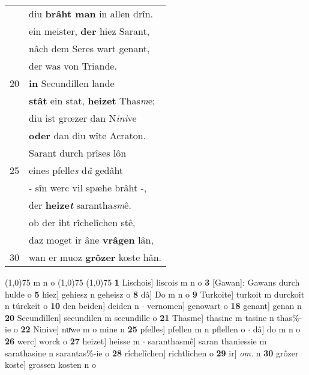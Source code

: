 \documentclass[8pt,a4paper,notitlepage]{article}
\begin{document}
\begin{table}[ht]
\begin{minipage}[t]{0.5\linewidth}
\begin{tabular}{rl}
 & diu \textbf{brâht man} in allen drîn.\\ 
 & ein meister, \textbf{der} hiez Sarant,\\ 
 & nâch dem Seres wart genant,\\ 
 & der was von Triande.\\ 
20 & \textbf{in} Secundillen lande\\ 
 & \textbf{stât} ein stat, \textbf{heizet} Thas\textit{m}e;\\ 
 & diu ist grœzer dan N\textit{ini}ve\\ 
 & \textbf{oder} dan diu wîte Acraton.\\ 
 & Sarant durch prîses lôn\\ 
25 & eines pfelle\textit{s} d\textit{â} gedâht\\ 
 & - sîn werc vil spæhe brâht -,\\ 
 & der \textbf{heize\textit{t}} sarantha\textit{sm}ê.\\ 
 & ob der iht rîchelîchen stê,\\ 
 & daz moget ir âne \textbf{vrâgen} lân,\\ 
30 & wan er muoz \textbf{grôzer} koste hân.\\ 
\end{tabular}
\scriptsize
\line(1,0){75} \newline
m n o \newline
\line(1,0){75} \newline
\newline
\line(1,0){75} \newline
\textbf{1} Lischois] liscois m n o \textbf{3} [Gawan]: Gawans durch hulde o \textbf{5} hiez] gehiesz n geheisz o \textbf{8} dâ] Do m n o \textbf{9} Turkoite] turkoit m durckoit n túrckeit o \textbf{10} den beiden] deiden n  $\cdot$ vernomen] genowart o \textbf{18} genant] genan n \textbf{20} Secundillen] secundilen m secundille o \textbf{21} Thasme] thasine m tasine n thas\%-ie o \textbf{22} Ninive] nuͯwe m o mine n \textbf{25} pfelles] pfellen m n pflellen o  $\cdot$ dâ] do m n o \textbf{26} werc] worck o \textbf{27} heizet] heisse m  $\cdot$ saranthasmê] saran thaniessie m sarathasine n sarantas\%-ie o \textbf{28} rîchelîchen] richtlichen o \textbf{29} ir] \textit{om.} n \textbf{30} grôzer koste] grossen kosten n o \newline
\end{minipage}
\end{table}
\newpage
\end{document}
